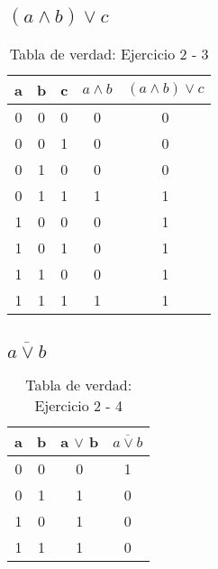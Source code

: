 \subsection{$(a \wedge b) \vee c$}
\begin{table}[!ht]
    \centering
    \begin{tabular}{|c|c|c|c|c|}
        \hline
        a & b & c & $a \wedge b$ & $(a \wedge b) \vee c$ \\
        \hline
        0 & 0 & 0 & 0 & 0 \\
        \hline
        0 & 0 & 1 & 0 & 0 \\
        \hline
        0 & 1 & 0 & 0 & 0 \\
        \hline
        0 & 1 & 1 & 1 & 1 \\
        \hline
        1 & 0 & 0 & 0 & 1 \\
        \hline
        1 & 0 & 1 & 0 & 1 \\
        \hline
        1 & 1 & 0 & 0 & 1 \\
        \hline
        1 & 1 & 1 & 1 & 1 \\
        \hline
    \end{tabular}
    \caption{Tabla de verdad: Ejercicio 2 - 3}\label{table:2-3}
\end{table}

\subsection{$\overline{a\vee b}$}
\begin{table}[!ht]
    \centering
    \begin{tabular}{|c|c|c|c|}
        \hline
        a & b & a $\vee$ b & \rule{0pt}{2.5ex}$\overline{a\vee b}$ \\
        \hline
        0 & 0 & 0 & 1\\
        \hline
        0 & 1 & 1 & 0\\
        \hline
        1 & 0 & 1 & 0\\
        \hline
        1 & 1 & 1 & 0\\
        \hline
    \end{tabular}
    \caption{Tabla de verdad: Ejercicio 2 - 4}\label{table:2-4}
\end{table}

